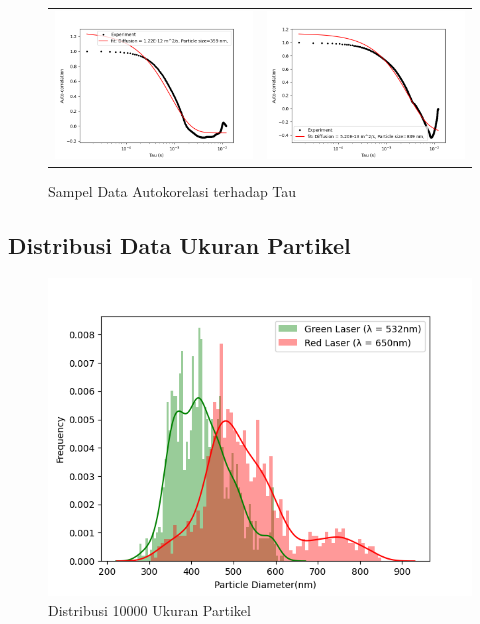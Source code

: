 \begin{figure}
  \ContinuedFloat
  \begin{longtable}{p{7cm}p{7cm}}
    \includegraphics[width=8cm]{Images/AutoCor_Hijau_Data1000-01.png}
    \centering{Laser Hijau}
    &
    \includegraphics[width=8cm]{Images/AutoCor_Merah_Data1000-01.png} 
    \centering{Laser Merah}\\
  \end{longtable}

  \caption{Sampel Data Autokorelasi terhadap Tau}
\end{figure}

\subsection{Distribusi Data Ukuran Partikel}
\begin{figure}[H]
  \centering
  \includegraphics[width=13cm]{Images/Distribusi 10000x.png}
  \caption{Distribusi 10000 Ukuran Partikel}
  \label{fig:dist10000x}
\end{figure}

